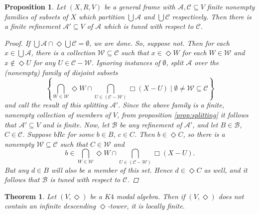 \documentclass[10pt,a4paper]{amsart}
\newtheorem{proposition}{Proposition}
\newtheorem{theorem}{Theorem}
\begin{document}
\begin{proposition}\label{prop:exists_tuned_wrt}
    Let $(X,R,V)$ be a general frame 
    with $\mathcal{A},\mathcal{C} \subseteq V$ finite nonempty families of subsets of $X$ which partition $\bigcup\mathcal{A}$ and $\bigcup \mathcal{C}$ respectively.
    Then there is a finite refinement $\mathcal{A}'\subseteq V$ of $\mathcal{A}$ which is tuned with respect to $\mathcal{C}$.
    

\begin{proof}
    If $\bigcup\mathcal{A} \cap \Diamond\bigcup \mathcal{C}=\emptyset$, we are done. So, suppose not.
    Then for each $x \in \bigcup \mathcal{A}$, there is a collection $\mathcal{W}\subseteq\mathcal{C}$ such that $x \in \Diamond W$ for each $W\in \mathcal{W}$ and $x\notin \Diamond U$ for any $U \in \mathcal{C-W}$.
    Ignoring instances of $\emptyset$, split $\mathcal{A}$ over the (nonempty) family of disjoint subsets
    \[
    \left\{\bigcap_{W \in \mathcal{W}} \Diamond W \cap 
    \bigcap_{U\in (\mathcal{C-W})}\Box (X-U) 
    \mid \emptyset \neq \mathcal{W} \subseteq \mathcal{C}\right\} 
    \]
    and call the result of this splitting $\mathcal{A}'$. Since the above family is a finite, nonempty collection of members of $V$, from proposition \ref{prop:splitting} it follows that $\mathcal{A}' \subseteq V$ and is finite. 
    Now, let $\mathcal{B}$ be any refinement of $\mathcal{A}'$, and let $B \in \mathcal{B}$, $C \in \mathcal{C}$.
    Suppose $bRc$ for some $b \in B$, $c \in C$. Then 
    $b \in \Diamond C$, so there is a nonempty $\mathcal{W} \subseteq \mathcal{C}$ such that $C \in \mathcal{W}$ and
    \[
    b \in \bigcap_{W \in \mathcal{W}} \Diamond W \cap \bigcap_{U\in (\mathcal{C-W})}\Box (X-U).
    \]
    But any $d \in B$ will also be a member of this set. Hence $d \in \Diamond C$ as well, and it follows that $\mathcal{B}$ is tuned with respect to $\mathcal{C}$.
    
\end{proof}
    
\end{proposition}

\begin{theorem} \label{thm:no_tower_implies_locally_finite}
    Let $(V,\Diamond)$ be a $K4$ modal algebra.
    Then if $(V,\Diamond)$ does not contain an infinite descending $\Diamond$-tower, it is locally finite.
\end{theorem}
\end{document}
